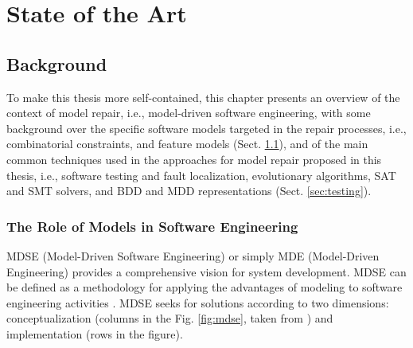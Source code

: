 \part{State of the Art}

\chapter{Background}\label{ch:background}

To make this thesis more self-contained, this chapter presents an overview of the context of model repair, i.e., model-driven software engineering, with some background over the specific software models targeted in the repair processes, i.e., combinatorial constraints, and feature models
(Sect. \ref{sec:modeldriven}), and of the main common techniques used in the approaches for model repair proposed in this thesis, i.e., software testing and fault localization, evolutionary algorithms, SAT and SMT solvers, and BDD and MDD representations (Sect. \ref{sec:testing}).


\section{The Role of Models in Software Engineering}\label{sec:modeldriven}

MDSE (Model-Driven Software Engineering) or simply MDE (Model-Driven Engineering) provides a comprehensive vision for system development. 
MDSE can be defined as a methodology for applying the advantages of modeling to software engineering activities \cite{brambillaModelDriven,hachem2016towards}.
MDSE seeks for solutions according to two dimensions: conceptualization (columns in the Fig. \ref{fig:mdse}, taken from \cite{brambillaModelDriven}) and implementation (rows in the figure).


